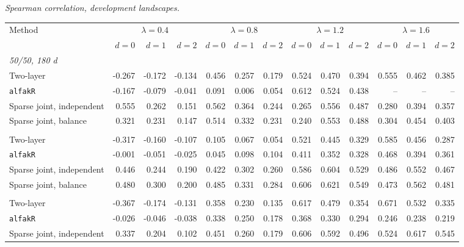 \noindent\textit{Spearman correlation, development landscapes.}
\begin{center}
\scriptsize
\setlength{\tabcolsep}{2.5pt}
\begin{tabular}{l*{12}{r}}
\toprule
Method & \multicolumn{3}{c}{$\lambda=0.4$} & \multicolumn{3}{c}{$\lambda=0.8$} & \multicolumn{3}{c}{$\lambda=1.2$} & \multicolumn{3}{c}{$\lambda=1.6$} \\
\cmidrule(lr){2-4}\cmidrule(lr){5-7}\cmidrule(lr){8-10}\cmidrule(lr){11-13}
 & $d=0$ & $d=1$ & $d=2$ & $d=0$ & $d=1$ & $d=2$ & $d=0$ & $d=1$ & $d=2$ & $d=0$ & $d=1$ & $d=2$ \\
\midrule
\multicolumn{13}{l}{\textit{50/50, 180 d}} \\
\quad Two-layer & -0.267 & -0.172 & -0.134 & 0.456 & 0.257 & 0.179 & 0.524 & 0.470 & 0.394 & 0.555 & 0.462 & 0.385 \\
\quad \texttt{alfakR} & -0.167 & -0.079 & -0.041 & 0.091 & 0.006 & 0.054 & 0.612 & 0.524 & 0.438 & -- & -- & -- \\
\quad Sparse joint, independent & 0.555 & 0.262 & 0.151 & 0.562 & 0.364 & 0.244 & 0.265 & 0.556 & 0.487 & 0.280 & 0.394 & 0.357 \\
\quad Sparse joint, balance & 0.321 & 0.231 & 0.147 & 0.514 & 0.332 & 0.231 & 0.240 & 0.553 & 0.488 & 0.304 & 0.454 & 0.403 \\
\addlinespace[2pt]
\multicolumn{13}{l}{\textit{200/200, 180 d}} \\
\quad Two-layer & -0.317 & -0.160 & -0.107 & 0.105 & 0.067 & 0.054 & 0.521 & 0.445 & 0.329 & 0.585 & 0.456 & 0.287 \\
\quad \texttt{alfakR} & -0.001 & -0.051 & -0.025 & 0.045 & 0.098 & 0.104 & 0.411 & 0.352 & 0.328 & 0.468 & 0.394 & 0.361 \\
\quad Sparse joint, independent & 0.446 & 0.244 & 0.190 & 0.422 & 0.302 & 0.260 & 0.586 & 0.604 & 0.529 & 0.486 & 0.552 & 0.467 \\
\quad Sparse joint, balance & 0.480 & 0.300 & 0.200 & 0.485 & 0.331 & 0.284 & 0.606 & 0.621 & 0.549 & 0.473 & 0.562 & 0.481 \\
\addlinespace[2pt]
\multicolumn{13}{l}{\textit{200/200, 360 d}} \\
\quad Two-layer & -0.367 & -0.174 & -0.131 & 0.358 & 0.230 & 0.135 & 0.617 & 0.479 & 0.354 & 0.671 & 0.532 & 0.335 \\
\quad \texttt{alfakR} & -0.026 & -0.046 & -0.038 & 0.338 & 0.250 & 0.178 & 0.368 & 0.330 & 0.294 & 0.246 & 0.238 & 0.219 \\
\quad Sparse joint, independent & 0.337 & 0.204 & 0.102 & 0.451 & 0.260 & 0.179 & 0.606 & 0.592 & 0.496 & 0.524 & 0.617 & 0.545 \\

\end{tabular}
\end{center}
